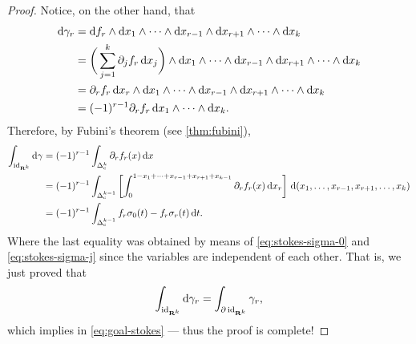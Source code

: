 \begin{proof}
    Notice, on the other hand, that
    \begin{align*}
        \mathrm{d} \gamma_r
         & = \mathrm{d} f_r \wedge \mathrm{d} x_1 \wedge \dots \wedge \mathrm{d} x_{r-1}
        \wedge \mathrm{d} x_{r+1} \wedge \dots \wedge \mathrm{d} x_k                                 \\
         & = \bigg(\sum_{j=1}^k \partial_j f_r\, \mathrm{d} x_j\bigg) \wedge \mathrm{d} x_1 \wedge
        \dots \wedge \mathrm{d} x_{r-1} \wedge \mathrm{d} x_{r+1} \wedge \dots \wedge \mathrm{d} x_k
        \\
         & = \partial_r f_r\, \mathrm{d} x_r \wedge \mathrm{d} x_1 \wedge \dots \wedge \mathrm{d} x_{r-1}
        \wedge \mathrm{d} x_{r+1} \wedge \dots \wedge \mathrm{d} x_k                                 \\
         & = (-1)^{r-1} \partial_r f_r\, \mathrm{d} x_1 \wedge \dots \wedge \mathrm{d} x_k.
    \end{align*}
    Therefore, by Fubini's theorem (see \cref{thm:fubini}),
    {\small
            \begin{align*}
                \int_{\operatorname{id}_{\mathbf{R}^k}} \mathrm{d} \gamma
                 & = (-1)^{r-1} \int_{\Delta_{\text{c}}^k} \partial_r f_r(x)\, \mathrm{d} x \\
                 & = (-1)^{r-1} \int_{\Delta_{\text{c}}^{k-1}} \left[
                    \int_0^{1 - x_1 + \dots + x_{r-1} + x_{r+1} + x_{k-1}}
                    \partial_r f_r(x)\, \mathrm{d} x_r
                    \right]\,
                \mathrm{d} (x_1, \dots, x_{r-1}, x_{r+1}, \dots, x_k)                       \\
                 & = (-1)^{r-1} \int_{\Delta_{\text{c}}^{k-1}} f_r\sigma_0(t) - f_r
                \sigma_r(t)\,
                \mathrm{d} t.
            \end{align*}
        }
    Where the last equality was obtained by means of \cref{eq:stokes-sigma-0} and
    \cref{eq:stokes-sigma-j} since the variables are independent of each other. That
    is, we just proved that
    \[
        \int_{\operatorname{id}_{\mathbf{R}^k}} \mathrm{d} \gamma_r = \int_{\partial \operatorname{id}_{\mathbf{R}^k}} \gamma_r,
    \]
    which implies in \cref{eq:goal-stokes} --- thus the proof is complete!
\end{proof}

